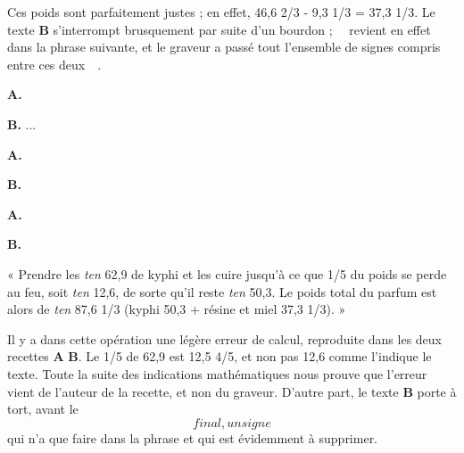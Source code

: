 \documentclass[a4paper, 11pt, oneside, landscape]{article}
\newcommand*\hieroAAAE{}
\newcommand*\hieroAAAH{}
\newcommand*\hieroAAAR{}
\newcommand*\hieroAACA{}
\newcommand*\hieroAACQ{}
\newcommand*\hieroAACR{}
\newcommand*\hieroAAEI{}
\newcommand*\hieroAAEK{}
\newcommand*\hieroAAFT{}
\newcommand*\hieroAAGA{}
\newcommand*\hieroAAGI{}
\newcommand*\hieroAAGM{}
\newcommand*\hieroAAGN{}
\newcommand*\hieroAAHJ{}
\newcommand*\hieroAAHK{}
\newcommand*\hieroAAIG{}
\newcommand*\hieroAAIT{}
\newcommand*\hieroAAIU{}
\newcommand*\hieroAAJB{}
\newcommand*\hieroAAJU{}
\newcommand*\hieroAAJV{}
\newcommand*\hieroAALJ{}
\newcommand*\hieroAAMQ{}
\newcommand*\hieroAAOU{}
\newcommand*\hieroAAPI{}
\newcommand*\hieroAAQZ{}
\newcommand*\hieroAARB{}
\newcommand*\hieroAARC{}
\newcommand*\hieroAASF{}
\newcommand*\hieroAASG{}
\newcommand*\hieroAASH{}
\newcommand*\hieroAASI{}
\newcommand*\hieroAASJ{}
\newcommand*\hieroAASK{}
\newcommand*\hieroAASL{}
\newcommand*\hieroAASM{}
\begin{document}
Ces poids sont parfaitement justes ; en effet, 46,6 2/3 - 9,3 1/3 = 37,3 1/3. Le texte \textbf{B} s'interrompt brusquement par suite d'un bourdon ; $\hieroAARB\:\hieroAARC\:\hieroAAEI\:\hieroAACA$ revient en effet dans la phrase suivante, et le graveur a passé tout l'ensemble de signes compris entre ces deux $\hieroAARB\:\hieroAARC\:\hieroAAEI\:\hieroAACA$. 

\hspace*{10mm}\textbf{A.}\hspace*{5mm} $\hieroAACQ\:\hieroAAAE\:\hieroAAAR\:\hieroAAOU\:\hieroAAMQ\:\hieroAAMQ\:\hieroAAGA\:\hieroAAJU\:\hieroAAHJ\:\hieroAACR\:\hieroAASF\:\hieroAAAH\:\hieroAACA\:\hieroAAQZ\:\hieroAASG\:\hieroAASH\:\hieroAASI\:\hieroAARB\:\hieroAARC\:\hieroAAEI\:\hieroAACA$

\hspace*{10mm}\textbf{B.}\hspace*{5mm} ...

\hspace*{10mm}\textbf{A.}\hspace*{5mm} $\hieroAAIT\:\hieroAAIU\:\hieroAAGA\:\hieroAAGI\:\hieroAAJV\:\hieroAAPI\:\hieroAASJ\:\hieroAAGA\:\hieroAAHJ$ \hspace*{22mm} $\hieroAAGN\:\hieroAAAE\:\hieroAAAR\:\hieroAALJ$

\hspace*{10mm}\textbf{B.}\hspace*{5mm} $\hieroAAGN\:\hieroAAFT\:\hieroAAIU\:\hieroAAGA\:\hieroAAJB\:\hieroAASK\:\hieroAAGN\:\hieroAAFT\:\hieroAASJ\:\hieroAAGA\:\hieroAAJB\:\hieroAAHJ\:$ \hspace*{8mm} $\hieroAAGN\:\hieroAAEK\:\hieroAASL$

\hspace*{10mm}\textbf{A.}\hspace*{5mm} $\hieroAASM\:\hieroAAGM\:\hieroAAGA\:\hieroAAJU\:\hieroAAHK$

\hspace*{10mm}\textbf{B.}\hspace*{5mm} $\hieroAASM\:\hieroAAGI\:\hieroAAHJ\:\hieroAAGA\:\hieroAAJB\:\hieroAAGI\:\hieroAAJV\:\hieroAAIG\:\hieroAAHK$

« Prendre les \emph{ten} 62,9 de kyphi et les cuire jusqu'à ce que 1/5 du poids se perde au feu, soit \emph{ten} 12,6, de sorte qu'il reste \emph{ten} 50,3. Le poids total du parfum est alors de \emph{ten} 87,6 1/3 (kyphi 50,3 + résine et miel 37,3 1/3). »

Il y a dans cette opération une légère erreur de calcul, reproduite dans les deux recettes \textbf{A} \textbf{B}. Le 1/5 de 62,9 est 12,5 4/5, et non pas 12,6 comme l'indique le texte. Toute la suite des indications mathématiques nous prouve que l'erreur vient de l'auteur de la recette, et non du graveur. D'autre part, le texte \textbf{B} porte à tort, avant le $\hieroAAHK$ final, un signe $\hieroAAIG$ qui n'a que faire dans la phrase et qui est évidemment à supprimer.
\end{document}
